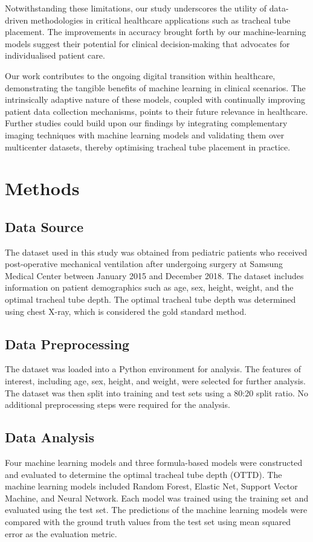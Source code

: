 \documentclass[11pt]{article}
\begin{document}
Notwithstanding these limitations, our study underscores the utility of data-driven methodologies in critical healthcare applications such as tracheal tube placement. The improvements in accuracy brought forth by our machine-learning models suggest their potential for clinical decision-making that advocates for individualised patient care. 

Our work contributes to the ongoing digital transition within healthcare, demonstrating the tangible benefits of machine learning in clinical scenarios. The intrinsically adaptive nature of these models, coupled with continually improving patient data collection mechanisms, points to their future relevance in healthcare. Further studies could build upon our findings by integrating complementary imaging techniques with machine learning models and validating them over multicenter datasets, thereby optimising tracheal tube placement in practice.

\section*{Methods}

\subsection*{Data Source}
The dataset used in this study was obtained from pediatric patients who received post-operative mechanical ventilation after undergoing surgery at Samsung Medical Center between January 2015 and December 2018. The dataset includes information on patient demographics such as age, sex, height, weight, and the optimal tracheal tube depth. The optimal tracheal tube depth was determined using chest X-ray, which is considered the gold standard method.

\subsection*{Data Preprocessing}
The dataset was loaded into a Python environment for analysis. The features of interest, including age, sex, height, and weight, were selected for further analysis. The dataset was then split into training and test sets using a 80:20 split ratio. No additional preprocessing steps were required for the analysis.

\subsection*{Data Analysis}
Four machine learning models and three formula-based models were constructed and evaluated to determine the optimal tracheal tube depth (OTTD). The machine learning models included Random Forest, Elastic Net, Support Vector Machine, and Neural Network. Each model was trained using the training set and evaluated using the test set. The predictions of the machine learning models were compared with the ground truth values from the test set using mean squared error as the evaluation metric.
\end{document}
